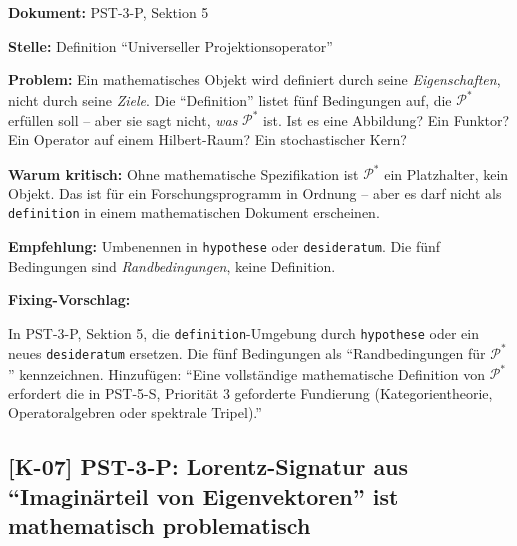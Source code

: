 \documentclass[11pt,a4paper]{article}
\newcommand{\K}[1]{\textbf{[K-#1]}}
\newcommand{\Dok}[1]{\noindent\textbf{Dokument:} #1\par\smallskip}
\newcommand{\Stelle}[1]{\noindent\textbf{Stelle:} #1\par\smallskip}
\newcommand{\Prob}[1]{\noindent\textbf{Problem:} #1\par\smallskip}
\newcommand{\Krit}[1]{\noindent\textbf{Warum kritisch:} #1\par\smallskip}
\newcommand{\Empf}[1]{\noindent\textbf{Empfehlung:} #1\par\smallskip}
\newenvironment{Fix}
  {\par\medskip\noindent\textbf{Fixing-Vorschlag:}\par\nobreak\smallskip}
  {\par\medskip}
\begin{document}
\Dok{PST-3-P, Sektion 5}
\Stelle{Definition ``Universeller Projektionsoperator''}
\Prob{Ein mathematisches Objekt wird definiert durch seine
\emph{Eigenschaften}, nicht durch seine \emph{Ziele}. Die
``Definition'' listet fünf Bedingungen auf, die $\mathcal{P}^*$
erfüllen soll -- aber sie sagt nicht, \emph{was} $\mathcal{P}^*$
ist. Ist es eine Abbildung? Ein Funktor? Ein Operator auf einem
Hilbert-Raum? Ein stochastischer Kern?}
\Krit{Ohne mathematische Spezifikation ist $\mathcal{P}^*$ ein
Platzhalter, kein Objekt. Das ist für ein Forschungsprogramm in
Ordnung -- aber es darf nicht als \texttt{definition} in einem
mathematischen Dokument erscheinen.}
\Empf{Umbenennen in \texttt{hypothese} oder \texttt{desideratum}. Die
fünf Bedingungen sind \emph{Randbedingungen}, keine Definition.}
\begin{Fix}
In PST-3-P, Sektion 5, die \texttt{definition}-Umgebung durch
\texttt{hypothese} oder ein neues \texttt{desideratum} ersetzen. Die
fünf Bedingungen als ``Randbedingungen für $\mathcal{P}^*$''
kennzeichnen. Hinzufügen: ``Eine vollständige mathematische
Definition von $\mathcal{P}^*$ erfordert die in PST-5-S, Priorität 3
geforderte Fundierung (Kategorientheorie, Operatoralgebren oder
spektrale Tripel).''
\end{Fix}

\subsection{\K{07} PST-3-P: Lorentz-Signatur aus ``Imaginärteil von Eigenvektoren'' ist mathematisch problematisch}
\end{document}

